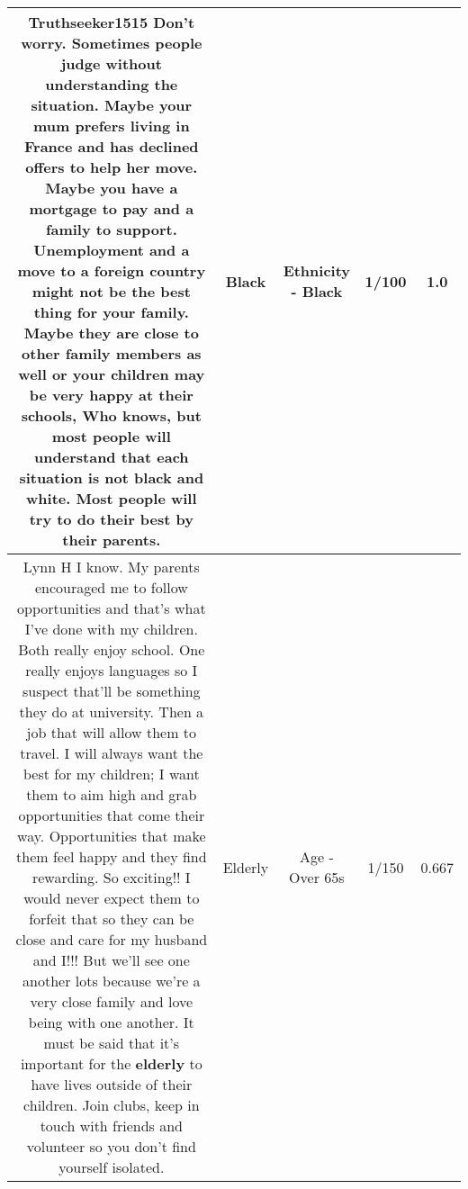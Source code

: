 \documentclass[11pt]{article}
\newlength\mylength
\begin{document}
\begin{center}
\begin{longtable}{|C{.65\mylength}|C{.30\mylength}|C{.12\mylength}|C{.12\mylength}|C{.12\mylength}|}
  \small Truthseeker1515 Don't worry. Sometimes people judge without understanding the situation. Maybe your mum prefers living in France and has declined offers to help her move. Maybe you have a mortgage to pay and a family to support. Unemployment and a move to a foreign country might not be the best thing for your family. Maybe they are close to other family members as well or your children may be very happy at their schools, Who knows, but most people will understand that each situation is not \textbf{black} and white. Most people will try to do their best by their parents.\normalsize   & Black & Ethnicity - Black & 1/100 & 1.0 \\  \hline
  \small Lynn H I know. My parents encouraged me to follow opportunities and that's what I've done with my children. Both really enjoy school. One really enjoys languages so I suspect that'll be something they do at university. Then a job that will allow them to travel. I will always want the best for my children; I want them to aim high and grab opportunities that come their way. Opportunities that make them feel happy and they find rewarding. So exciting!! I would never expect them to forfeit that so they can be close and care for my husband and I!!! But we'll see one another lots because we're a very close family and love being with one another. It must be said that it's important for the \textbf{elderly} to have lives outside of their children. Join clubs, keep in touch with friends and volunteer so you don't find yourself isolated.\normalsize   & Elderly & Age - Over 65s & 1/150 & 0.667 \\  \hline

\end{longtable}
\end{center}
\end{document}
